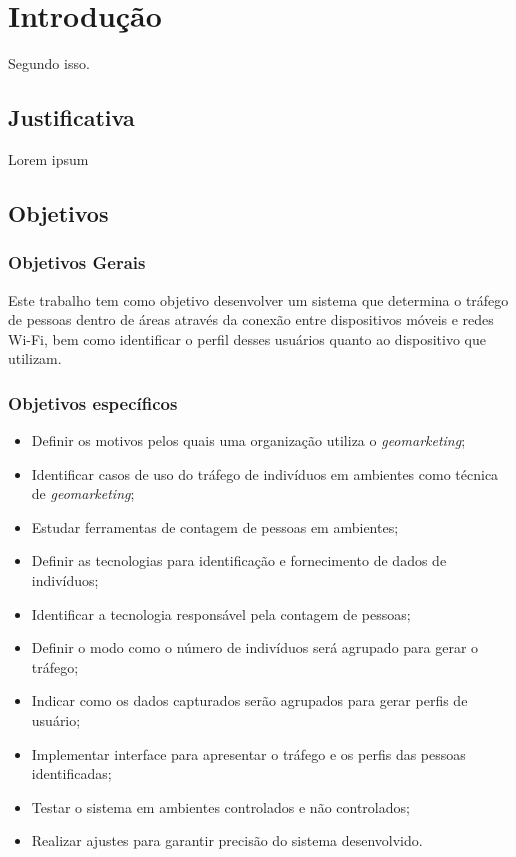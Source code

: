 
\chapter{Introdução}
\label{introducao}

Segundo  isso.

\section{Justificativa}
\label{justificativa}

Lorem ipsum

\section{Objetivos}
\label{objetivos}

\subsection{Objetivos Gerais}
Este trabalho tem como objetivo desenvolver um sistema que determina o tráfego de pessoas dentro de áreas através da conexão entre dispositivos móveis e redes
Wi-Fi, bem como identificar o perfil desses usuários quanto ao dispositivo que utilizam.

\subsection{Objetivos específicos}
\begin{itemize}
  \item Definir os motivos pelos quais uma organização utiliza o \emph{geomarketing};
  \item Identificar casos de uso do tráfego de indivíduos em ambientes como técnica
  de \emph{geomarketing};
  \item Estudar ferramentas de contagem de pessoas em ambientes;
  \item Definir as tecnologias para identificação e fornecimento de dados de indivíduos;
  \item Identificar a tecnologia responsável pela contagem de pessoas;
  \item Definir o modo como o número de indivíduos será agrupado para gerar o tráfego;
  \item Indicar como os dados capturados serão agrupados para gerar perfis de usuário;
  \item Implementar interface para apresentar o tráfego e os perfis das pessoas identificadas;
  \item Testar o sistema em ambientes controlados e não controlados;
  \item Realizar ajustes para garantir precisão do sistema desenvolvido.
\end{itemize}
